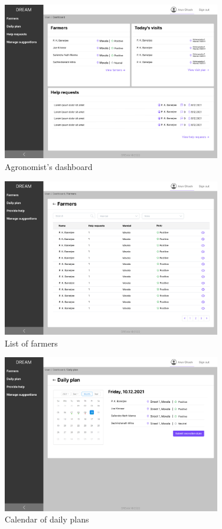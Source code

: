 \begin{figure}[H]
\centering
\includegraphics[width=0.85\textwidth]{mockups/Agronomist_Dashboard.png}
\caption{Agronomist's dashboard}
\end{figure}

\begin{figure}[H]
\centering
\includegraphics[width=0.85\textwidth]{mockups/Agronomist_Dashboard_Farmers.png}
\caption{List of farmers}
\end{figure}

\begin{figure}[H]
\centering
\includegraphics[width=0.85\textwidth]{mockups/Agronomist_Dashboard_Visit plan.png}
\caption{Calendar of daily plans}
\end{figure}

